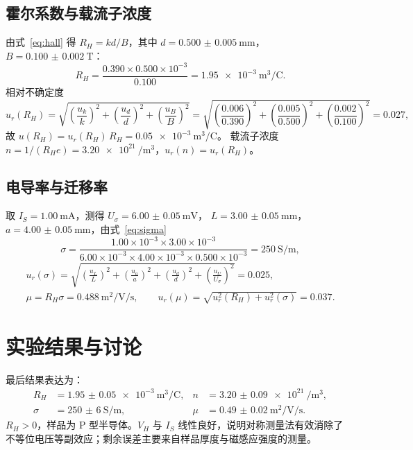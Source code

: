 \documentclass[boxed]{physlab}
\begin{document}
\subsection{霍尔系数与载流子浓度}
由式~\eqref{eq:hall} 得 $R_H = k d / B$，其中 $d = \qty{0.500(5)}{\milli\metre}$，
$B = \qty{0.100(2)}{\tesla}$：
\begin{equation*}
  R_H = \frac{0.390 \times 0.500 \times 10^{-3}}{0.100}
      = \qty{1.95e-3}{\cubic\metre\per\coulomb} .
\end{equation*}
相对不确定度
\begin{equation*}
  u_r(R_H) = \sqrt{\left(\frac{u_k}{k}\right)^2 + \left(\frac{u_d}{d}\right)^2 + \left(\frac{u_B}{B}\right)^2}
           = \sqrt{\left(\frac{0.006}{0.390}\right)^2 + \left(\frac{0.005}{0.500}\right)^2 + \left(\frac{0.002}{0.100}\right)^2}
           = 0.027 ,
\end{equation*}
故 $u(R_H) = u_r(R_H)\, R_H = \qty{0.05e-3}{\cubic\metre\per\coulomb}$。
载流子浓度 $n = 1/(R_H e) = \qty[per-mode = power]{3.20e21}{\per\cubic\metre}$，$u_r(n) = u_r(R_H)$。

\subsection{电导率与迁移率}
取 $I_S = \qty{1.00}{\milli\ampere}$，测得 $U_\sigma = \qty{6.00(5)}{\milli\volt}$，
$L = \qty{3.00(5)}{\milli\metre}$，$a = \qty{4.00(5)}{\milli\metre}$，由式~\eqref{eq:sigma}
\begin{equation*}
  \sigma = \frac{1.00 \times 10^{-3} \times 3.00 \times 10^{-3}}{6.00 \times 10^{-3} \times 4.00 \times 10^{-3} \times 0.500 \times 10^{-3}}
         = \qty{250}{\siemens\per\metre} ,
\end{equation*}
\begin{gather*}
  u_r(\sigma) = \sqrt{\left(\frac{u_L}{L}\right)^2 + \left(\frac{u_a}{a}\right)^2 + \left(\frac{u_d}{d}\right)^2 + \left(\frac{u_U}{U_\sigma}\right)^2} = 0.025 , \\
  \mu = R_H \sigma = \qty{0.488}{\metre\squared\per\volt\per\second} , \qquad
  u_r(\mu) = \sqrt{u_r^2(R_H) + u_r^2(\sigma)} = 0.037 .
\end{gather*}

\section{实验结果与讨论}
最后结果表达为：
\begin{align*}
  R_H &= \qty{1.95(5)e-3}{\cubic\metre\per\coulomb}, &
  n &= \qty[per-mode = power]{3.20(9)e21}{\per\cubic\metre}, \\
  \sigma &= \qty{250(6)}{\siemens\per\metre}, &
  \mu &= \qty{0.49(2)}{\metre\squared\per\volt\per\second}.
\end{align*}
$R_H > 0$，样品为 P 型半导体。$V_H$ 与 $I_S$ 线性良好，说明对称测量法有效消除了
不等位电压等副效应；剩余误差主要来自样品厚度与磁感应强度的测量。
\end{document}
